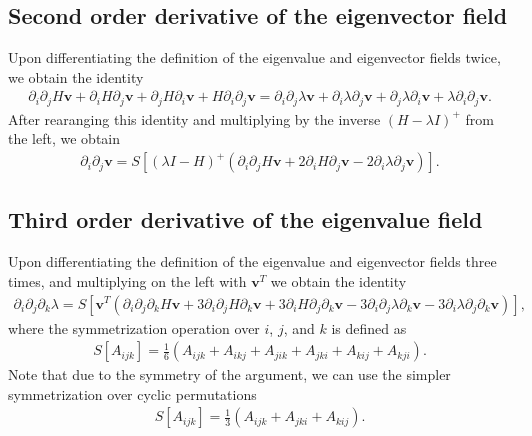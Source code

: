 \documentclass{article}
\begin{document}
\subsection{Second order derivative of the eigenvector field}
Upon differentiating the definition of the eigenvalue and eigenvector fields twice, we obtain the identity 
\begin{align}
\partial_i \partial_j H \bm{v} + \partial_i H \partial_j \bm{v} + \partial_j H \partial_i \bm{v} + H \partial_i \partial_j \bm{v}
= \partial_i \partial_j \lambda \bm{v} + \partial_i \lambda \partial_j \bm{v}+ \partial_j \lambda \partial_i \bm{v} + \lambda \partial_i \partial_j \bm{v}.
\end{align}
After rearanging this identity and multiplying by the inverse $(H-\lambda I)^+$ from the left, we obtain
\begin{align}
\partial_i \partial_j \bm{v} = S[(\lambda I - H)^+ ( 
\partial_i \partial_j H \bm{v}  
+2 \partial_i H \partial_j \bm{v} 
- 2\partial_i \lambda \partial_j \bm{v})].
\end{align}


\subsection{Third order derivative of the eigenvalue field}
Upon differentiating the definition of the eigenvalue and eigenvector fields three times, and multiplying on the left with $\bm{v}^T$ we obtain the identity
\begin{align}
\partial_i \partial_j \partial_k \lambda = S[\bm{v}^T(
\partial_i \partial_j \partial_k H \bm{v} 
+3 \partial_i \partial_j H \partial_k \bm{v} 
+3 \partial_i H \partial_j \partial_k \bm{v} 
-3 \partial_i \partial_j \lambda \partial_k \bm{v} 
-3 \partial_i \lambda \partial_j \partial_k \bm{v})],
\end{align}
where the symmetrization operation over $i$, $j$, and $k$ is defined as
\begin{align}
S[A_{ijk}] = \frac{1}{6}(A_{ijk} + A_{ikj} + A_{jik} + A_{jki} + A_{kij} + A_{kji}).
\end{align}
Note that due to the symmetry of the argument, we can use the simpler symmetrization over cyclic permutations
\begin{align}
S[A_{ijk}] = \frac{1}{3}(A_{ijk} + A_{jki} + A_{kij}).
\end{align}
\end{document}
